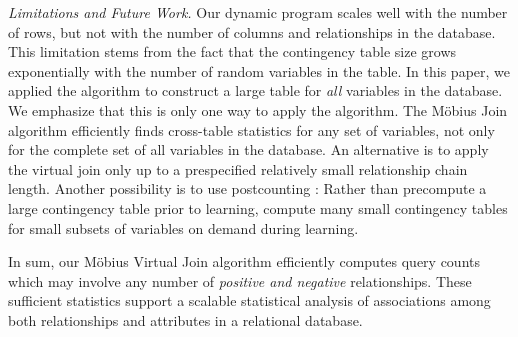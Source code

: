 \documentclass{acm_proc_article-sp}
\begin{document}


\emph{Limitations and Future Work.} 
Our dynamic program scales well with the number of rows, but not with the number of columns and relationships in the database. 
This limitation stems from the fact that the contingency table size grows exponentially with the number of random variables in the table. In this paper, we applied the algorithm to construct a large table for {\em all} variables in the database. We emphasize that this is only one way to apply the algorithm. The M\"obius Join algorithm efficiently finds cross-table statistics for any set of variables, not only for the complete set of all variables in the database. An alternative is to apply the virtual join only up to a prespecified relatively small relationship chain length.
Another possibility is to use postcounting \cite{lv2012}: Rather than precompute a large contingency table prior to learning, compute many small contingency tables for  small subsets of variables on demand during learning. 
%
%


In sum, our M\"obius Virtual Join algorithm efficiently computes query counts which may involve any number of {\em positive and negative }relationships. %
These sufficient statistics support a scalable statistical analysis of  associations among both relationships and attributes in a relational database.
\end{document}
